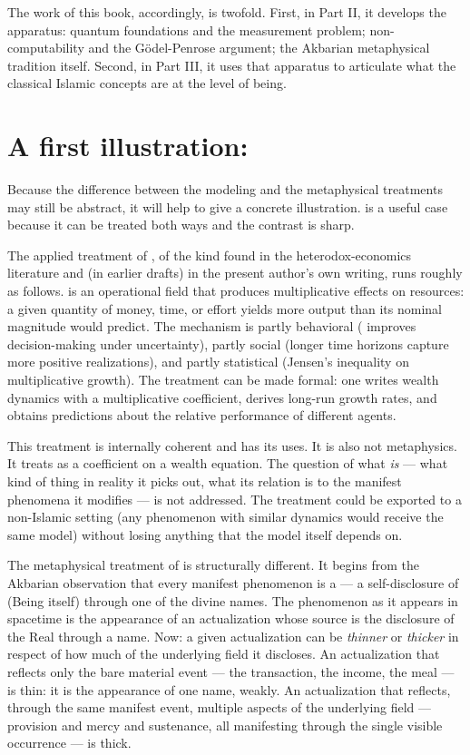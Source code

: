 The work of this book, accordingly, is twofold. First, in Part II, it
develops the apparatus: quantum foundations and the measurement
problem; non-computability and the G\"odel-Penrose argument; the
Akbarian metaphysical tradition itself. Second, in Part III, it uses
that apparatus to articulate what the classical Islamic concepts are
at the level of being.

\section{A first illustration: }
\label{sec:barakah-illustration}

Because the difference between the modeling and the metaphysical
treatments may still be abstract, it will help to give a concrete
illustration.  is a useful case because it can be treated
both ways and the contrast is sharp.

The applied treatment of , of the kind found in the
heterodox-economics literature and (in earlier drafts) in the present
author's own writing, runs roughly as follows.  is an
operational field that produces multiplicative effects on resources: a
given quantity of money, time, or effort yields more output than its
nominal magnitude would predict. The mechanism is partly behavioral
( improves decision-making under uncertainty), partly
social (longer time horizons capture more positive realizations), and
partly statistical (Jensen's inequality on multiplicative growth). The
treatment can be made formal: one writes wealth dynamics with a
multiplicative  coefficient, derives long-run growth
rates, and obtains predictions about the relative performance of
different agents.

This treatment is internally coherent and has its uses. It is also
not metaphysics. It treats  as a coefficient on a wealth
equation. The question of what  \emph{is} --- what kind
of thing in reality it picks out, what its relation is to the
manifest phenomena it modifies --- is not addressed. The treatment
could be exported to a non-Islamic setting (any phenomenon with
similar dynamics would receive the same model) without losing
anything that the model itself depends on.

The metaphysical treatment of  is structurally different.
It begins from the Akbarian observation that every manifest phenomenon
is a  --- a self-disclosure of  (Being itself)
through one of the divine names. The phenomenon as it appears in
spacetime is the appearance of an actualization whose source is the
disclosure of the Real through a name. Now: a given actualization can
be \emph{thinner} or \emph{thicker} in respect of how much of the
underlying field it discloses. An actualization that reflects only the
bare material event --- the transaction, the income, the meal --- is
thin: it is the appearance of one name, weakly. An actualization that
reflects, through the same manifest event, multiple aspects of the
underlying field --- provision and mercy and sustenance, all manifesting
through the single visible occurrence --- is thick.

